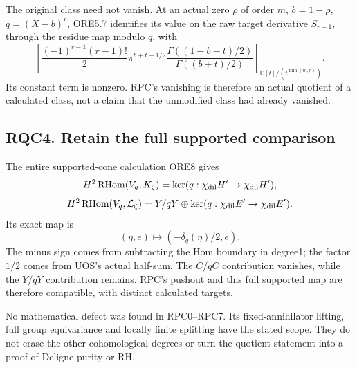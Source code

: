 The original class need not vanish. At an actual zero \(\rho\) of order
\(m\), \(b=1-\rho\), \(q=(X-b)^r\), ORE5.7 identifies its value on the
raw target derivative \(S_{r-1}\), through the residue map modulo \(q\),
with \[
\left[
\frac{(-1)^{r-1}(r-1)!}{2}
\pi^{b+t-1/2}
\frac{\Gamma((1-b-t)/2)}{\Gamma((b+t)/2)}
\right]_{\mathbb C[t]/(t^{\min(m,r)})}.
\] Its constant term is nonzero. RPC's vanishing is therefore an actual
quotient of a calculated class, not a claim that the unmodified class
had already vanished.

\subsection{RQC4. Retain the full supported
comparison}\label{rqc4.-retain-the-full-supported-comparison}

The entire supported-cone calculation ORE8 gives \[
H^2\operatorname{RHom}(V_q,K_\zeta)
=\ker(q:\chi_{\rm dil}H'\to\chi_{\rm dil}H'),
\] \[
H^2\operatorname{RHom}(V_q,\mathcal L_\zeta)
=Y/qY\oplus\ker(q:\chi_{\rm dil}E'\to\chi_{\rm dil}E').
\] Its exact map is \[
(\eta,e)\longmapsto(-\delta_q(\eta)/2,e).
\] The minus sign comes from subtracting the Hom boundary in degree1;
the factor \(1/2\) comes from UOS's actual half-sum. The \(C/qC\)
contribution vanishes, while the \(Y/qY\) contribution remains. RPC's
pushout and this full supported map are therefore compatible, with
distinct calculated targets.

No mathematical defect was found in RPC0--RPC7. Its fixed-annihilator
lifting, full group equivariance and locally finite splitting have the
stated scope. They do not erase the other cohomological degrees or turn
the quotient statement into a proof of Deligne purity or RH.
